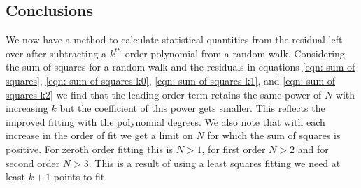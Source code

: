 \subsection{Conclusions}
We now have a method to calculate statistical quantities from the residual
left over after subtracting a $k^{th}$ order polynomial from a random walk.
Considering the sum of squares for a random walk and the residuals in equations
\eqref{eqn: sum of squares}, \eqref{eqn: sum of squares k0},
\eqref{eqn: sum of squares k1}, and \eqref{eqn: sum of squares k2} we find that
the leading order term retains the same
power of $N$ with increasing $k$ but the coefficient of this power gets
smaller. This reflects the improved fitting with the polynomial degrees. We
also note that with each increase in the order of fit we get a limit
on $N$ for which the sum of squares is positive. For zeroth order fitting this
is $N>1$, for first order $N>2$ and for second order $N>3$. This is a result
of using a least squares fitting we need at least $k+1$ points to fit.

